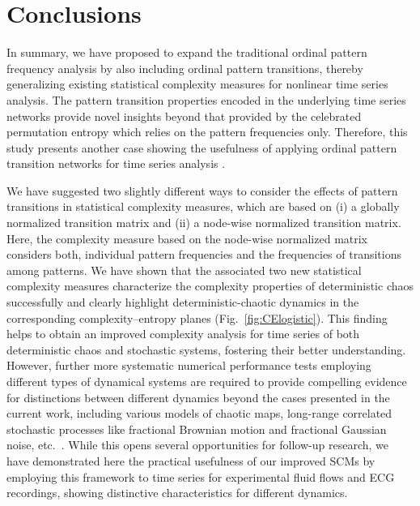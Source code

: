 \documentclass[12pt,aip,cha,reprint,nofootinbib]{revtex4-1}
\begin{document}
\section{Conclusions} \label{sec:con}
In summary, we have proposed to expand the traditional ordinal pattern frequency analysis by also including ordinal pattern transitions, thereby generalizing existing statistical complexity measures for nonlinear time series analysis. The pattern transition properties encoded in the underlying time series networks provide novel insights beyond that provided by the celebrated permutation entropy which relies on the pattern frequencies only. Therefore, this study presents another case showing the usefulness of applying ordinal pattern transition networks for time series analysis \cite{ZouPR2018}. 

We have suggested two slightly different ways to consider the effects of pattern transitions in statistical complexity measures, which are based on (i) a globally normalized transition matrix and (ii) a node-wise normalized transition matrix. Here, the complexity measure based on the node-wise normalized matrix considers both, individual pattern frequencies and the frequencies of transitions among patterns. We have shown that the associated two new statistical complexity measures characterize the complexity properties of deterministic chaos successfully and clearly highlight deterministic-chaotic dynamics in the corresponding complexity--entropy planes (Fig.~\ref{fig:CElogistic}). This finding helps to obtain an improved complexity analysis for time series of both deterministic chaos and stochastic systems, fostering their better understanding. However, further more systematic numerical performance tests employing different types of dynamical systems are required to provide compelling evidence for distinctions between different dynamics beyond the cases presented in the current work, including various models of chaotic maps, long-range correlated stochastic processes like fractional Brownian motion and fractional Gaussian noise, etc.~\cite{BorgesAMC2019,RossoPRE2007}. While this opens several opportunities for follow-up research, we have demonstrated here the practical usefulness of our improved SCMs by employing this framework to time series for experimental fluid flows and ECG recordings, showing distinctive characteristics for different dynamics. 
\end{document}
